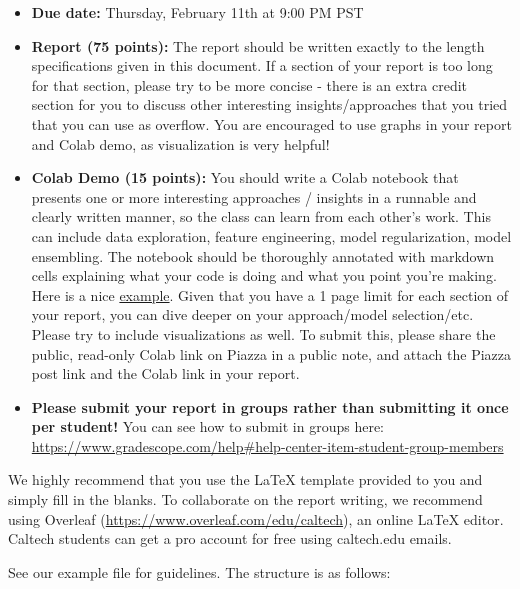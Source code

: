 \begin{itemize}
    \item \textbf{Due date:} Thursday, February 11th at 9:00 PM PST
    \item \textbf{Report (75 points):} The report should be written exactly to the length specifications given in this document. If a section of your report is too long for that section, please try to be more concise - there is an extra credit section for you to discuss other interesting insights/approaches that you tried that you can use as overflow. You are encouraged to use graphs in your report and Colab demo, as visualization is very helpful!
    \item \textbf{Colab Demo (15 points):} You should write a Colab notebook that presents one or more interesting approaches / insights in a runnable and clearly written manner, so the class can learn from each other's work. This can include data exploration, feature engineering, model regularization, model ensembling. The notebook should be thoroughly annotated with markdown cells explaining what your code is doing and what you point you're making. Here is a nice \href{https://www.kaggle.com/cdeotte/how-to-choose-cnn-architecture-mnist}{example}. Given that you have a 1 page limit for each section of your report, you can dive deeper on your approach/model selection/etc. Please try to include visualizations as well. To submit this, please share the public, read-only Colab link on Piazza in a public note, and attach the Piazza post link and the Colab link in your report.
    \item \textbf{Please submit your report in groups rather than submitting it once per student!}  You can see how to submit in groups here:\\ \url{https://www.gradescope.com/help#help-center-item-student-group-members}
\end{itemize}

\noindent We highly recommend that you use the LaTeX template provided to you and simply fill in the blanks. To collaborate on the report writing, we recommend using Overleaf (\url{https://www.overleaf.com/edu/caltech}), an online LaTeX editor. Caltech students can get a pro account for free using caltech.edu emails.

\noindent See our example file for guidelines. The structure is as follows:

